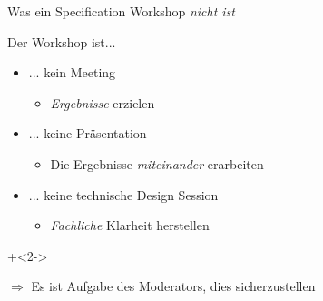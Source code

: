 \begin{frame}{Was ein Specification Workshop \em nicht \em ist}

Der Workshop ist...

\begin{itemize}
	\item ... kein Meeting
	\begin{itemize}
		\item \emph{Ergebnisse} erzielen
	\end{itemize}
	
	\item ... keine Präsentation
	\begin{itemize}
		\item Die Ergebnisse \emph{miteinander} erarbeiten
	\end{itemize}
	
	\item ... keine technische Design Session
	\begin{itemize}
		\item \emph{Fachliche} Klarheit herstellen
	\end{itemize}
	
\end{itemize}

\onslide+<2->
	
$\Rightarrow$ Es ist Aufgabe des Moderators, dies sicherzustellen

\end{frame}


